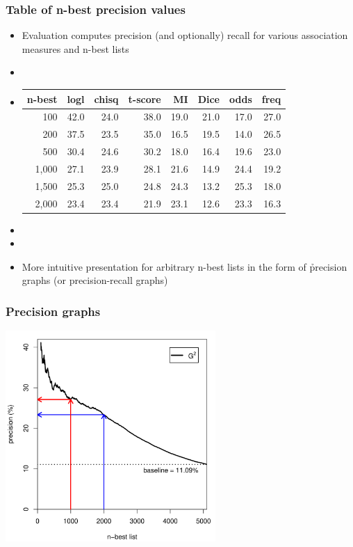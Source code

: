 \documentclass[t]{beamer} %
\begin{document}
\begin{frame}
  \frametitle{Table of n-best precision values}

  \begin{itemize}
  \item Evaluation computes precision (and optionally) recall for various
    association measures and n-best lists
  \item[]
  \item[]
    \begin{center}\small
      \begin{tabular}{r || r | r | r | r | r | r | r}
        n-best & logl & chisq & t-score & MI  & Dice & odds & freq \\
        \hline
         100   & 42.0 & 24.0 &   38.0  & 19.0 & 21.0 & 17.0 & 27.0 \\
         200   & 37.5 & 23.5 &   35.0  & 16.5 & 19.5 & 14.0 & 26.5 \\
         500   & 30.4 & 24.6 &   30.2  & 18.0 & 16.4 & 19.6 & 23.0 \\
       1,000   & 27.1 & 23.9 &   28.1  & 21.6 & 14.9 & 24.4 & 19.2 \\
       1,500   & 25.3 & 25.0 &   24.8  & 24.3 & 13.2 & 25.3 & 18.0 \\
       2,000   & 23.4 & 23.4 &   21.9  & 23.1 & 12.6 & 23.3 & 16.3
      \end{tabular}
    \end{center}
  \item[]
  \item[]
  \item More intuitive presentation for arbitrary n-best lists in the form of
    \h{precision graphs} (or precision-recall graphs)
  \end{itemize}
\end{frame}

\begin{frame}
  \frametitle{Precision graphs}

  \begin{center}
    \includegraphics[width=8cm]{img/mwe_eval_illustration}
  \end{center}
\end{frame}
\end{document}
